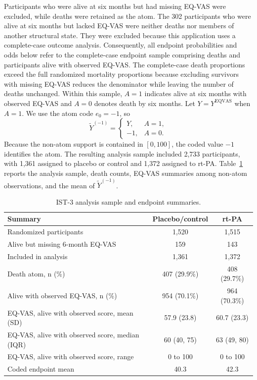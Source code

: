 \documentclass[11pt]{article}
\newcommand{\ApplicationN}{2,733}
\newcommand{\ApplicationControlN}{1,361}
\newcommand{\ApplicationTreatmentN}{1,372}
\begin{document}
Participants who were alive at six months but had missing EQ-VAS were excluded, while deaths were retained as the atom. The 302 participants who were alive at six months but lacked EQ-VAS were neither deaths nor members of another structural state. They were excluded because this application uses a complete-case outcome analysis. Consequently, all endpoint probabilities and odds below refer to the complete-case endpoint sample comprising deaths and participants alive with observed EQ-VAS\@. The complete-case death proportions exceed the full randomized mortality proportions because excluding survivors with missing EQ-VAS reduces the denominator while leaving the number of deaths unchanged. Within this sample, $A=1$ indicates alive at six months with observed EQ-VAS and $A=0$ denotes death by six months. Let $Y=Y^{\mathrm{EQVAS}}$ when $A=1$. We use the atom code $e_0=-1$, so
\[
  \widetilde{Y}^{(-1)}
  =
  \begin{cases}
    Y, & A=1,\\
    -1, & A=0.
  \end{cases}
\]
Because the non-atom support is contained in $[0,100]$, the coded value $-1$ identifies the atom. The resulting analysis sample included \ApplicationN{} participants, with \ApplicationControlN{} assigned to placebo or control and \ApplicationTreatmentN{} assigned to rt-PA\@. Table~\ref{tab:ist3-descriptives} reports the analysis sample, death counts, EQ-VAS summaries among non-atom observations, and the mean of $\widetilde{Y}^{(-1)}$.

\begin{table}[htbp]
\centering
\caption{IST-3 analysis sample and endpoint summaries.}
\label{tab:ist3-descriptives}
\small
\begin{tabular}{lcc}
\toprule
Summary & Placebo/control & rt-PA
\\
\midrule
Randomized participants & 1,520 & 1,515\\
Alive but missing 6-month EQ-VAS & 159 & 143\\
Included in analysis & 1,361 & 1,372\\
Death atom, n (\%) & 407 (29.9\%) & 408 (29.7\%)\\
Alive with observed EQ-VAS, n (\%) & 954 (70.1\%) & 964 (70.3\%)\\
EQ-VAS, alive with observed score, mean (SD) & 57.9 (23.8) & 60.7 (23.3)\\
EQ-VAS, alive with observed score, median (IQR) & 60 (40, 75) & 63 (49, 80)\\
EQ-VAS, alive with observed score, range & 0 to 100 & 0 to 100\\
Coded endpoint mean & 40.3 & 42.3\\
\bottomrule
\end{tabular}
\end{table}
\end{document}
